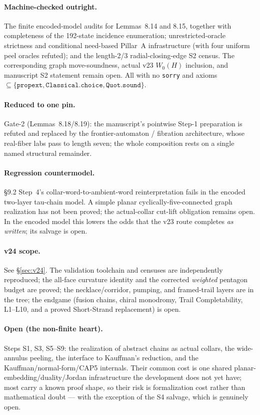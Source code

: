 \documentclass[11pt]{article}
\theoremstyle{definition}
\newcommand{\Wz}{W_0}
\begin{document}
\paragraph{Machine-checked outright.} The finite encoded-model audits for
Lemmas~8.14 and 8.15, together with completeness of the 192-state incidence
enumeration; unrestricted-oracle strictness and conditional need-based Pillar~A
infrastructure (with four uniform peel oracles refuted); and the length-2/3
radial-closing-edge S2 census. The corresponding graph move-soundness, actual
v23 $\Wz(H)$ inclusion, and manuscript S2 statement remain open. All with no \texttt{sorry} and axioms
$\subseteq\{\texttt{propext},\texttt{Classical.choice},\texttt{Quot.sound}\}$.

\paragraph{Reduced to one pin.} Gate-2 (Lemmas~8.18/8.19): the manuscript's
pointwise Step-1 preparation is refuted and replaced by the frontier-automaton /
fibration architecture, whose real-fiber labs pass to length seven; the whole
composition rests on a single named structural remainder.

\paragraph{Regression countermodel.} \S9.2 Step~4's collar-word-to-ambient-word
reinterpretation fails in the encoded two-layer tau-chain model. A simple planar
cyclically-five-connected graph realization has not been proved; the
actual-collar cut-lift obligation remains open. In the encoded model this
lowers the odds that the v23 route completes \emph{as written}; its salvage is
open.

\paragraph{v24 scope.} See \S\ref{sec:v24}. The validation toolchain and
censuses are independently reproduced; the all-face curvature identity and
the corrected \emph{weighted} pentagon budget are proved; the
necklace/corridor, pumping, and framed-trail layers are in the tree; the
endgame (fusion chains, chiral monodromy, Trail Completability, L1--L10, and
a proved Short-Strand replacement) is open.

\paragraph{Open (the non-finite heart).} Steps S1, S3, S5--S9: the realization of
abstract chains as actual collars, the wide-annulus peeling, the interface to
Kauffman's reduction, and the Kauffman/normal-form/CAP5 internals. Their common
cost is one shared planar-embedding/duality/Jordan infrastructure the development
does not yet have; most carry a known proof shape, so their risk is
formalization cost rather than mathematical doubt --- with the exception of the S4
salvage, which is genuinely open.
\end{document}
